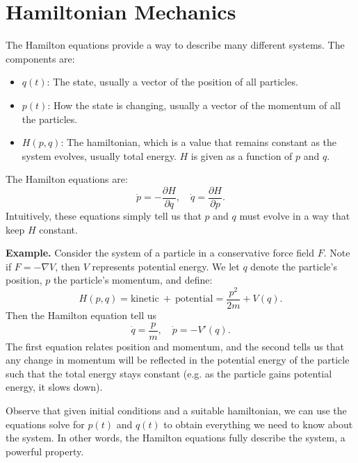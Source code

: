 \section{Hamiltonian Mechanics}
The Hamilton equations provide a way to describe many different systems. The components are:
\begin{itemize}
    \item $q(t)$: The state, usually a vector of the position of all particles.
    \item $p(t)$: How the state is changing, usually a vector of the momentum of all the particles.
    \item $H(p, q)$: The hamiltonian, which is a value that remains constant as the system evolves, usually total energy. $H$ is given as a function of $p$ and $q$.
\end{itemize}
The Hamilton equations are:
\[
    \dot{p} = - \frac{\partial H}{\partial q}, \quad \dot{q} = \frac{\partial H}{\partial p}.
\]
Intuitively, these equations simply tell us that $p$ and $q$ must evolve in a way that keep $H$ constant.

\hsep

\noindent
\textbf{Example.} Consider the system of a particle in a conservative force field $F$. Note if $F = -\nabla V$, then $V$ represents potential energy. We let $q$ denote the particle's position, $p$ the particle's momentum, and define:
\[
    H(p, q) = \text{kinetic} \ + \ \text{potential} = \frac{p^2}{2m} + V(q).
\]
Then the Hamilton equation tell us
\[
    \dot{q} = \frac{p}{m}, \quad \dot{p} = - V'(q).
\]
The first equation relates position and momentum, and the second tells us that any change in momentum will be reflected in the potential energy of the particle such that the total energy stays constant (e.g. as the particle gains potential energy, it slows down).

\hsep

Observe that given initial conditions and a suitable hamiltonian, we can use the equations solve for $p(t)$ and $q(t)$ to obtain everything we need to know about the system. In other words, the Hamilton equations fully describe the system, a powerful property.
